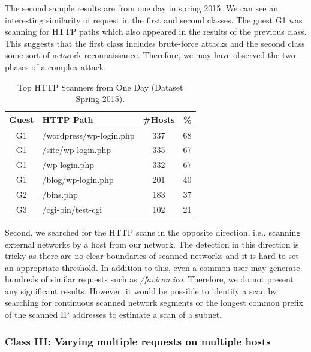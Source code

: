 The second sample results are from one day in spring 2015. We can see an interesting similarity of request in the first and second classes. The guest G1 was scanning for HTTP paths which also appeared in the results of the previous class. This suggests that the first class includes brute-force attacks and the second class some sort of network reconnaissance. Therefore, we may have observed the two phases of a complex attack.

\begin{table}[ht]
\centering
\begin{tabular}{| c | l | c | r |} \hline
Guest & HTTP Path & \#Hosts & \% \\ \hline
G1 & /wordpress/wp-login.php & 337 & 68 \\ \hline
G1 & /site/wp-login.php & 335 & 67 \\ \hline
G1 & /wp-login.php & 332 & 67 \\ \hline
G1 & /blog/wp-login.php & 201 & 40 \\ \hline
G2 & /bins.php & 183 & 37 \\ \hline
G3 & /cgi-bin/test-cgi & 102 & 21 \\ \hline
\end{tabular}
\caption{Top HTTP Scanners from One Day (Dataset Spring 2015).}
\label{tab:httpsecurity-scanners2}
\end{table}

Second, we searched for the HTTP scans in the opposite direction, i.e., scanning external networks by a host from our network. The detection in this direction is tricky as there are no clear boundaries of scanned networks and it is hard to set an appropriate threshold. In addition to this, even a common user may generate hundreds of similar requests such as \textit{/favicon.ico}. Therefore, we do not present any significant results. However, it would be possible to identify a scan by searching for continuous scanned network segments or the longest common prefix of the scanned IP addresses to estimate a scan of a subnet.

\subsubsection{Class III: Varying multiple requests on multiple hosts}

